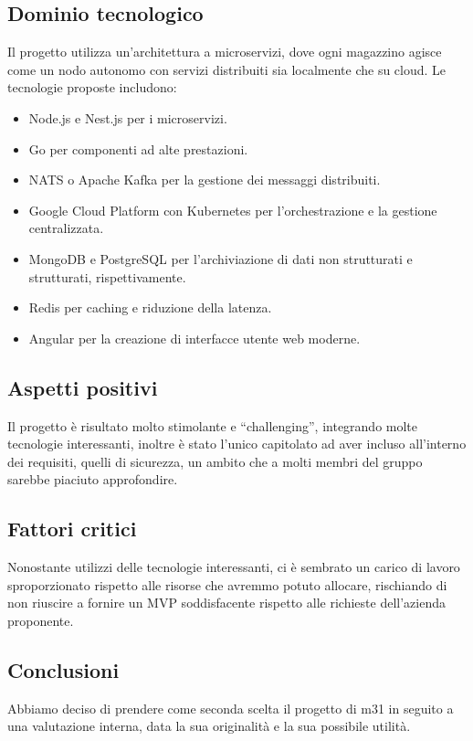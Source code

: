 \documentclass[italian, 12pt]{article}
\begin{document}
\subsection{Dominio tecnologico}
Il progetto utilizza un'architettura a microservizi, dove ogni magazzino agisce come un nodo autonomo con servizi distribuiti sia localmente che su cloud. Le tecnologie proposte includono: 
\begin{itemize}
\item Node.js e Nest.js per i microservizi. 
\item Go per componenti ad alte prestazioni. 
\item NATS o Apache Kafka per la gestione dei messaggi distribuiti. 
\item Google Cloud Platform con Kubernetes per l'orchestrazione e la gestione centralizzata. 
\item MongoDB e PostgreSQL per l'archiviazione di dati non strutturati e strutturati, rispettivamente. 
\item Redis per caching e riduzione della latenza. 
\item Angular per la creazione di interfacce utente web moderne.
\end{itemize}

\subsection{Aspetti positivi}
Il progetto è risultato molto stimolante e “challenging”, integrando molte tecnologie interessanti, inoltre è stato l’unico capitolato ad aver incluso all’interno dei requisiti, quelli di sicurezza, un ambito che a molti membri del gruppo sarebbe piaciuto approfondire.

\subsection{Fattori critici}
Nonostante utilizzi delle tecnologie interessanti, ci è sembrato un carico di lavoro sproporzionato rispetto alle risorse che avremmo potuto allocare, rischiando di non riuscire a fornire un MVP soddisfacente rispetto alle richieste dell’azienda proponente.

\subsection{Conclusioni}
Abbiamo deciso di prendere come seconda scelta il progetto di m31 in seguito a una valutazione interna, data la sua originalità e la sua possibile utilità.
\end{document}
